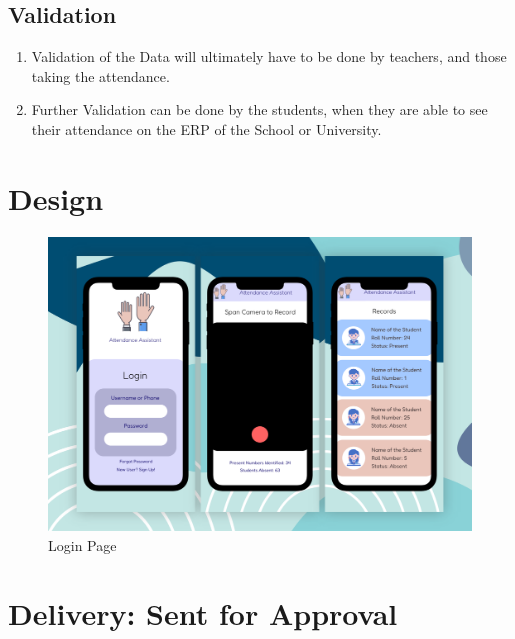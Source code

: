 \documentclass[11pt]{article}
\begin{document}
\subsection{Validation}
\begin{enumerate}
    \item Validation of the Data will ultimately have to be done by teachers, and those taking the attendance.
    \item Further Validation can be done by the students, when they are able to see their attendance on the ERP of the School or University.
\end{enumerate}

\section{Design}
\begin{figure}[H]
    \begin{small}
        \begin{center}
            \includegraphics[scale=0.1]{app.png}
        \end{center}
        \caption{Login Page}
    \end{small}
\end{figure}



\section{Delivery: Sent for Approval}
\end{document}
